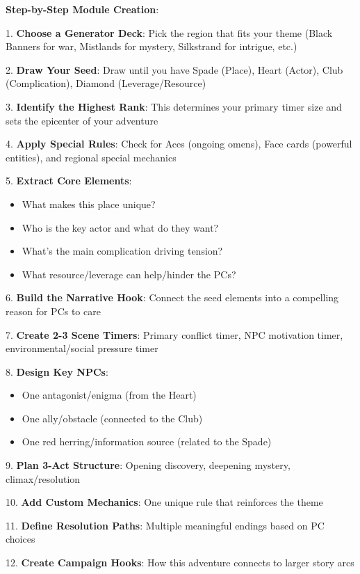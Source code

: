 \documentclass[11pt]{article}
\begin{document}
\begin{mdframed}[backgroundcolor=modulebg]
\textbf{Step-by-Step Module Creation}:

1. \textbf{Choose a Generator Deck}: Pick the region that fits your theme (Black Banners for war, Mistlands for mystery, Silkstrand for intrigue, etc.)

2. \textbf{Draw Your Seed}: Draw until you have Spade (Place), Heart (Actor), Club (Complication), Diamond (Leverage/Resource)

3. \textbf{Identify the Highest Rank}: This determines your primary timer size and sets the epicenter of your adventure

4. \textbf{Apply Special Rules}: Check for Aces (ongoing omens), Face cards (powerful entities), and regional special mechanics

5. \textbf{Extract Core Elements}:
   \begin{itemize}
   \item What makes this place unique?
   \item Who is the key actor and what do they want?
   \item What's the main complication driving tension?
   \item What resource/leverage can help/hinder the PCs?
   \end{itemize}

6. \textbf{Build the Narrative Hook}: Connect the seed elements into a compelling reason for PCs to care

7. \textbf{Create 2-3 Scene Timers}: Primary conflict timer, NPC motivation timer, environmental/social pressure timer

8. \textbf{Design Key NPCs}: 
   \begin{itemize}
   \item One antagonist/enigma (from the Heart)
   \item One ally/obstacle (connected to the Club)
   \item One red herring/information source (related to the Spade)
   \end{itemize}

9. \textbf{Plan 3-Act Structure}: Opening discovery, deepening mystery, climax/resolution

10. \textbf{Add Custom Mechanics}: One unique rule that reinforces the theme

11. \textbf{Define Resolution Paths}: Multiple meaningful endings based on PC choices

12. \textbf{Create Campaign Hooks}: How this adventure connects to larger story arcs
\end{mdframed}
\end{document}
